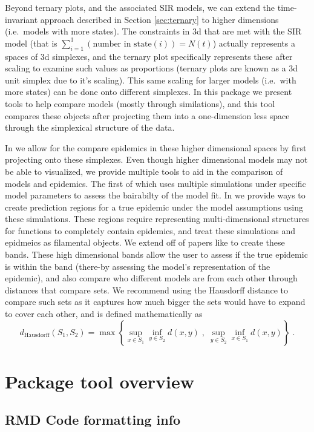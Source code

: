 \documentclass[
  shortnames]{jss}
\begin{document}
Beyond ternary plots, and the associated SIR models, we can extend the
time-invariant approach described in Section \ref{sec:ternary} to higher
dimensions (i.e.~models with more states). The constraints in 3d that
are met with the SIR model (that is
\(\sum_{i=1}^3 (\text{number in state}(i)) = N(t)\)) actually represents
a spaces of 3d simplexes, and the ternary plot specifically represents
these after scaling to examine such values as proportions (ternary plots
are known as a 3d unit simplex due to it's scaling). This same scaling
for larger models (i.e.~with more states) can be done onto different
simplexes. In this package we present tools to help compare models
(mostly through similations), and this tool compares these objects after
projecting them into a one-dimension less space through the simplexical
structure of the data.

In  we allow for the compare epidemics in these higher
dimensional spaces by first projecting onto these simplexes. Even though
higher dimensional models may not be able to visualized, we provide
multiple tools to aid in the comparison of models and epidemics. The
first of which uses multiple simulations under specific model parameters
to assess the bairabilty of the model fit. In  we
provide ways to create prediction regions for a true epidemic under the
model assumptions using these simulations. These regions require
representing multi-dimensional structures for functions to completely
contain epidemics, and treat these simulations and epidmeics as
filamental objects. We extend off of papers like \citet{Dalmasso2019a}
to create these bands. These high dimensional bands allow the user to
assess if the true epidemic is within the band (there-by assessing the
model's representation of the epidemic), and also compare who different
models are from each other through distances that compare sets. We
recommend using the Hausdorff distance to compare such sets as it
captures how much bigger the sets would have to expand to cover each
other, and is defined mathematically as \[
d_\text{Hausdorff}(S_1, S_2) = \max \left\{ \sup_{x \in S_1} \inf_{y \in S_2} d(x,y) \;,\; \sup_{y \in S_2} \inf_{x \in S_1} d(x,y)\right\}\;.
\]

\section[Package overview]{Package tool overview}\label{sec:overview}

\hypertarget{rmd-code-formatting-info}{%
\subsection{RMD Code formatting info}\label{rmd-code-formatting-info}}
\end{document}
